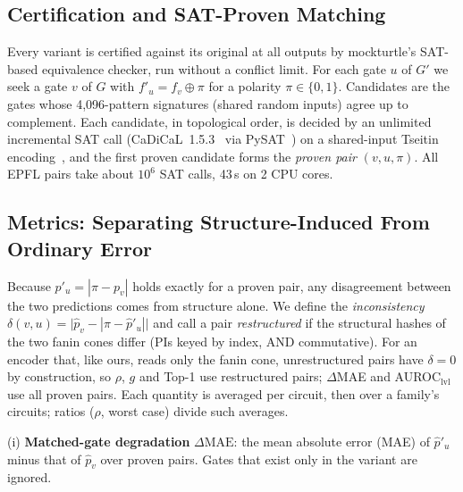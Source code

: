 \subsection{Certification and SAT-Proven Matching}\label{sec:matching}
Every variant is certified against its original at all outputs by mockturtle's SAT-based equivalence
checker, run without a conflict limit. For each gate $u$ of $G'$ we seek
a gate $v$ of $G$ with $f'_u=f_v\oplus\pi$ for a polarity $\pi\in\{0,1\}$. Candidates are the gates whose
4{,}096-pattern signatures (shared random inputs) agree up to complement. Each candidate, in topological order, is
decided by an unlimited incremental SAT call (CaDiCaL~1.5.3~\cite{cadical2020} via PySAT~\cite{DBLP:conf/sat/IgnatievMM18}) on a
shared-input Tseitin encoding~\cite{tseitin}, and the first proven candidate forms the \emph{proven pair}
$(v,u,\pi)$. All EPFL pairs take about $10^6$ SAT calls, 43\,s on 2 CPU cores.

\subsection{Metrics: Separating Structure-Induced From Ordinary Error}\label{sec:metrics}
Because $p'_u=|\pi-p_v|$ holds exactly for a proven pair, any disagreement between the two predictions comes from
structure alone. We define the \emph{inconsistency} $\delta(v,u)=\big|\hat p_v-|\pi-\hat p'_u|\big|$ and call a
pair \emph{restructured} if the structural hashes of the two fanin cones differ (PIs keyed by index, AND
commutative). For an encoder that, like ours, reads only the fanin cone, unrestructured pairs have $\delta=0$ by
construction, so $\rho$, $g$ and Top-1 use restructured pairs; $\Delta$MAE and AUROC$_\mathrm{lvl}$ use all proven
pairs. Each quantity is averaged per circuit, then over a family's circuits; ratios ($\rho$, worst case)
divide such averages.

\noindent(i) \textbf{Matched-gate degradation} $\Delta\mathrm{MAE}$: the mean absolute error (MAE) of
$\hat p'_u$ minus that of $\hat p_v$ over proven pairs. Gates that exist only in the variant are ignored.

